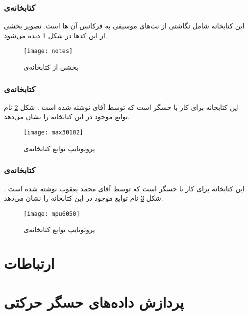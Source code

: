 \newpage
\subsubsection{کتابخانه‌ی }
این کتابخانه شامل نگاشتی از نت‌های موسیقی به فرکانس آن ها است. تصویر بخشی از این کدها در شکل \ref{fig:notes} دیده می‌شود.

\begin{figure}[h]
	\centering
	\texttt{[image: notes]}
	\caption{بخشی از کتابخانه‌ی }
	\label{fig:notes}
\end{figure}

\subsubsection{کتابخانه‌ی }
این کتابخانه برای کار با حسگر  است که توسط آقای  نوشته شده است \cite{max30102}. شکل \ref{fig:max} نام توابع موجود در این کتابخانه را نشان می‌دهد.

\begin{figure}[h]
	\centering
	\texttt{[image: max30102]}
	\caption{پروتوتایپ توابع کتابخانه‌ی }
	\label{fig:max}
\end{figure}

\newpage
\subsubsection{کتابخانه‌ی }
این کتابخانه برای کار با حسگر  است که توسط آقای محمد یعقوب نوشته شده است \cite{mpu6050}. شکل \ref{fig:mpu} نام توابع موجود در این کتابخانه را نشان می‌دهد.

\begin{figure}[h]
	\centering
	\texttt{[image: mpu6050]}
	\caption{پروتوتایپ توابع کتابخانه‌ی }
	\label{fig:mpu}
\end{figure}

\section{ارتباطات} \label{sec:comm}

\section{پردازش داده‌های حسگر حرکتی}
